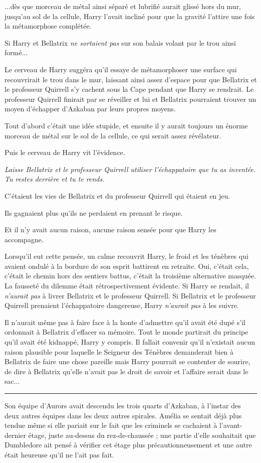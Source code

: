 ...dès que morceau de métal ainsi séparé et lubrifié aurait glissé hors du mur, jusqu'au sol de la cellule, Harry l'avait incliné pour que la gravité l'attire une fois la métamorphose complétée.

Si Harry et Bellatrix \emph{ne sortaient pas}  sur son balais volant par le trou ainsi formé...

Le cerveau de Harry suggéra qu'il essaye de métamorphoser une surface qui recouvrirait le trou dans le mur, laissant ainsi assez d'espace pour que Bellatrix et le professeur Quirrell s'y cachent sous la Cape pendant que Harry se rendrait. Le professeur Quirrell finirait par se réveiller et lui et Bellatrix pourraient trouver un moyen d'échapper d'Azkaban par leurs propres moyens.

Tout d'abord c'était une idée stupide, et ensuite il y aurait toujours un énorme morceau de métal sur le sol de la cellule, ce qui serait assez révélateur.

Puis le cerveau de Harry vit l'évidence.

\emph{Laisse Bellatrix et le professeur Quirrell utiliser l'échappatoire que tu as inventée. Tu restes derrière et tu te rends.} 

C'étaient les vies de Bellatrix et du professeur Quirrell qui étaient en jeu.

Ils gagnaient plus qu'ils ne perdaient en prenant le risque.

Et il n'y avait aucun raison, aucune raison sensée pour que Harry les accompagne.

Lorsqu'il eut cette pensée, un calme recouvrit Harry, le froid et les ténèbres qui avaient ondulé à la bordure de son esprit battirent en retraite. Oui, c'était cela, c'était le chemin hors des sentiers battus, c'était la troisième alternative masquée. La fausseté du dilemme était rétrospectivement évidente. Si Harry se rendait, il \emph{n'aurait pas } à livrer Bellatrix et le professeur Quirrell. Si Bellatrix et le professeur Quirrell prenaient l'échappatoire dangereuse, Harry \emph{n'aurait pas}  à les suivre.

Il n'aurait même pas à faire face à la honte d'admettre qu'il avait été dupé s'il ordonnait à Bellatrix d'effacer sa mémoire. Tout le monde partirait du principe qu'il avait été kidnappé, Harry y compris. Il fallait convenir qu'il n'existait aucun raison plausible pour laquelle le Seigneur des Ténèbres demanderait bien à Bellatrix de faire une chose pareille mais Harry pourrait se contenter de sourire, de dire à Bellatrix qu'elle n'avait pas le droit de savoir et l'affaire serait dans le sac...
\par\noindent\rule{\textwidth}{0.4pt}
Son équipe d'Aurors avait descendu les trois quarts d'Azkaban, à l'instar des deux autres équipes dans les deux autres spirales. Amélia se sentait déjà plus tendue même si elle pariait sur le fait que les criminels se cachaient à l'avant-dernier étage, juste au-dessus du rez-de-chaussée ; une partie d'elle souhaitait que Dumbledore ait pensé à vérifier cet étage plus précautionneusement et une autre était heureuse qu'il ne l'ait pas fait.

